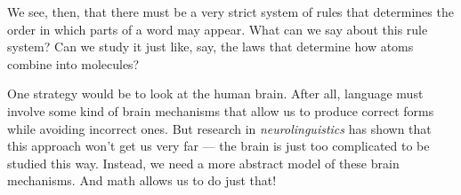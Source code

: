 %
We see, then, that there must be a very strict system of rules that determines the order in which parts of a word may appear.
What can we say about this rule system?
Can we study it just like, say, the laws that determine how atoms combine into molecules?

One strategy would be to look at the human brain.
After all, language must involve some kind of brain mechanisms that allow us to produce correct forms while avoiding incorrect ones.
But research in \emph{neurolinguistics} has shown that this approach won't get us very far --- the brain is just too complicated to be studied this way.
Instead, we need a more abstract model of these brain mechanisms.
And math allows us to do just that!


